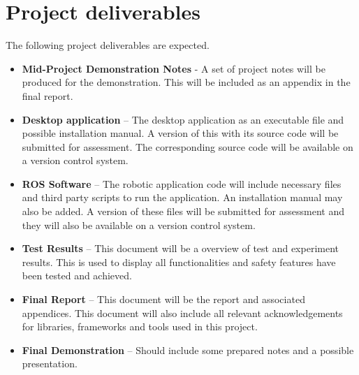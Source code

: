 \documentclass[11pt,fleqn,twoside]{article}
\begin{document}
\section{Project deliverables}
The following project deliverables are expected.

\begin{itemize}
    \item \textbf{Mid-Project Demonstration Notes} - A set of project notes will be produced 
                  for the demonstration. This will be included as an appendix in the final 
                  report.

    \item \textbf{Desktop application} -- The desktop application as an executable file and 
                  possible installation manual. A version of this with its source code will be 
                  submitted for assessment. The corresponding source code will be available on a version 
                  control system.  

    \item \textbf{ROS Software} -- The robotic application code will include necessary files and 
                  third party scripts to run the application. An installation manual may also be 
                  added. A version of these files will be submitted for assessment and they 
                  will also be available on a version control system.

    \item \textbf{Test Results} -- This document will be a overview of test and experiment results. 
                  This is used to display all functionalities and safety features have been tested and 
                  achieved.

    \item \textbf{Final Report} -- This document will be the report and associated appendices. 
                  This document will also include all relevant acknowledgements for libraries, 
                  frameworks and tools used in this project.

    \item \textbf{Final Demonstration} -- Should include some prepared notes and a possible 
                  presentation.
\end{itemize}

\nocite{*} 


%

\renewcommand{\refname}{Annotated Bibliography}  %
\end{document}
